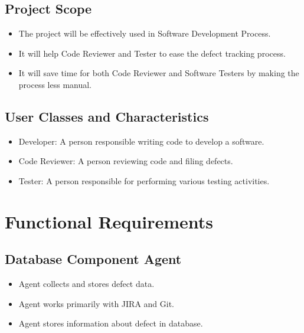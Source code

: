 \documentclass[oneside,a4paper,12pt]{book}
\begin{document}
\subsection{Project Scope}
\setlength{\parskip}{0.0pt}
\begin{itemize}
	\item The project will be effectively used in Software Development Process.\par

	\item It will help Code Reviewer and Tester to ease the defect tracking process.\par
	
	\item It will save time for both Code Reviewer and Software Testers by making the process less manual.


\end{itemize}\par

\subsection{User Classes and Characteristics}
\begin{itemize}

    \item Developer: A person responsible writing code to develop a software.\par

	\item Code Reviewer: A person reviewing code and filing defects.\par

	\item Tester: A person responsible for performing various testing activities.
\end{itemize}\par
    


\section {Functional Requirements}
\subsection{Database Component Agent}
\setlength{\parskip}{0.0pt}
\begin{itemize}
	\item Agent collects and stores defect data.\par

	\item Agent works primarily with JIRA and Git.\par

	\item Agent stores information about defect in database.
\end{itemize}\par
\end{document}
